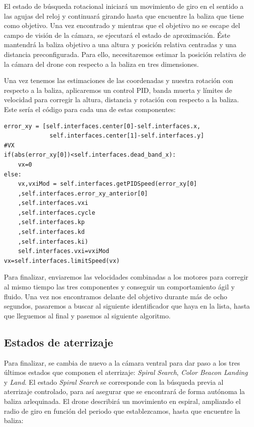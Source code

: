 El estado de búsqueda rotacional iniciará un movimiento de giro en el sentido a las agujas del reloj y continuará girando hasta que encuentre la baliza que tiene como objetivo.
Una vez encontrado y mientras que el objetivo no se escape del campo de visión de la cámara, se ejecutará el estado de aproximación. Éste mantendrá la baliza objetivo a una altura y posición relativa centradas y una distancia preconfigurada. Para ello, necesitaremos estimar la posición relativa de la cámara del drone con respecto a la baliza en tres dimensiones. 

Una vez tenemos las estimaciones de las coordenadas y nuestra rotación con respecto a la baliza, aplicaremos un control PID, banda muerta y límites de velocidad para corregir la altura, distancia y rotación con respecto a la baliza. Este sería el código para cada una de estas componentes:

\begin{lstlisting}[backgroundcolor=\color{gray!15}]
error_xy = [self.interfaces.center[0]-self.interfaces.x,
             self.interfaces.center[1]-self.interfaces.y]
#VX
if(abs(error_xy[0])<self.interfaces.dead_band_x):
	vx=0
else:
	vx,vxiMod = self.interfaces.getPIDSpeed(error_xy[0]
	,self.interfaces.error_xy_anterior[0]
	,self.interfaces.vxi
	,self.interfaces.cycle
	,self.interfaces.kp
	,self.interfaces.kd
	,self.interfaces.ki)
	self.interfaces.vxi=vxiMod	
vx=self.interfaces.limitSpeed(vx)	
\end{lstlisting}

Para finalizar, enviaremos las velocidades combinadas a los motores para corregir al mismo tiempo las tres componentes y conseguir un comportamiento ágil y fluido. Una vez nos encontramos delante del objetivo durante más de ocho segundos, pasaremos a buscar al siguiente identificador que haya en la lista, hasta que lleguemos al final y pasemos al siguiente algoritmo.

\subsection{Estados de aterrizaje}

Para finalizar, se cambia de nuevo a la cámara ventral para dar paso a los tres últimos estados que componen el aterrizaje: \textit{Spiral Search}, \textit{Color Beacon Landing} y \textit{Land}. 
El estado \textit{Spiral Search} se corresponde con la búsqueda previa al aterrizaje controlado, para así asegurar que se encontrará de forma autónoma la baliza arlequinada. El drone describirá un movimiento en espiral, ampliando el radio de giro en función del periodo que establezcamos, hasta que encuentre la baliza:

